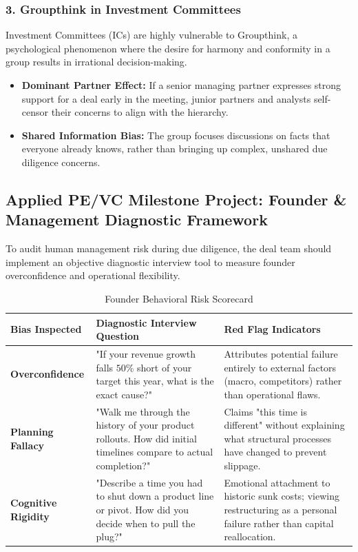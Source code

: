 \documentclass[11pt,a4paper]{article}
\begin{document}
\subsubsection{3. Groupthink in Investment Committees}
Investment Committees (ICs) are highly vulnerable to Groupthink, a psychological phenomenon where the desire for harmony and conformity in a group results in irrational decision-making. 
\begin{itemize}
    \item \textbf{Dominant Partner Effect:} If a senior managing partner expresses strong support for a deal early in the meeting, junior partners and analysts self-censor their concerns to align with the hierarchy.
    \item \textbf{Shared Information Bias:} The group focuses discussions on facts that everyone already knows, rather than bringing up complex, unshared due diligence concerns.
\end{itemize}

\subsection{Applied PE/VC Milestone Project: Founder \& Management Diagnostic Framework}
To audit human management risk during due diligence, the deal team should implement an objective diagnostic interview tool to measure founder overconfidence and operational flexibility.

\begin{table}[htbp]
\centering
\caption{Founder Behavioral Risk Scorecard}
\begin{tabular}{lp{6cm}p{6cm}}
\toprule
\textbf{Bias Inspected} & \textbf{Diagnostic Interview Question} & \textbf{Red Flag Indicators} \\
\midrule
\textbf{Overconfidence} & "If your revenue growth falls $50\%$ short of your target this year, what is the exact cause?" & Attributes potential failure entirely to external factors (macro, competitors) rather than operational flaws. \\
\addlinespace
\textbf{Planning Fallacy} & "Walk me through the history of your product rollouts. How did initial timelines compare to actual completion?" & Claims "this time is different" without explaining what structural processes have changed to prevent slippage. \\
\addlinespace
\textbf{Cognitive Rigidity} & "Describe a time you had to shut down a product line or pivot. How did you decide when to pull the plug?" & Emotional attachment to historic sunk costs; viewing restructuring as a personal failure rather than capital reallocation. \\
\bottomrule
\end{tabular}
\end{table}
\end{document}
